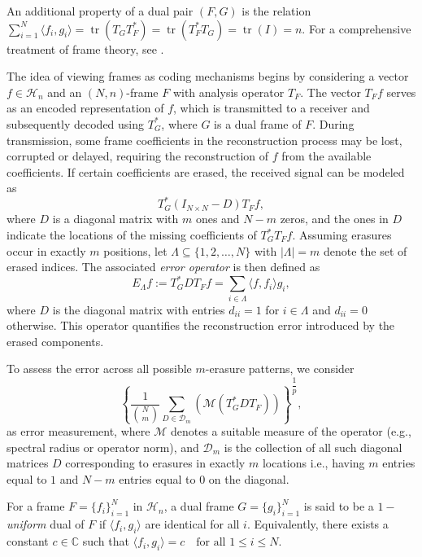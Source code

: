\documentclass[final,1p,times]{elsarticle}
\begin{document}
\noindent
An additional property of a dual pair \( (F, G) \) is the relation  $\sum_{i=1}^N \langle f_i, g_i \rangle = \operatorname{tr}(T_G T_F^*) = \operatorname{tr}(T_F^* T_G) = \operatorname{tr}(I) = n.$
For a comprehensive treatment of frame theory, see \cite{ole}.

   The idea of viewing frames as coding mechanisms begins by considering a vector 
\( f \in \mathcal{H}_n \) and an \((N,n)\)-frame \( F \) with analysis operator \( T_F \). 
The vector \( T_F f \) serves as an encoded representation of \( f \), 
which is transmitted to a receiver and subsequently decoded using \( T_G^* \), 
where \( G \) is a dual frame of \( F \).  During transmission, some frame coefficients in the reconstruction process may be lost,  corrupted or delayed, requiring the reconstruction of \( f \) from the available coefficients. 
If certain coefficients are erased, the received signal can be modeled as
\[
T_G^* (I_{N \times N} - D) T_F f,
\]
where \( D \) is a diagonal matrix with \( m \) ones and \( N-m \) zeros, 
and the ones in \( D \) indicate the locations of the missing coefficients of 
\( T_G^* T_F f \). Assuming erasures occur in exactly \( m \) positions, let 
\( \Lambda \subseteq \{1,2,\dots,N\} \) with \( |\Lambda| = m \) denote the set of erased indices. 
The associated \emph{error operator} is then defined as
\[
E_{\Lambda} f := T_G^* D T_F f 
= \sum_{i \in \Lambda} \langle f, f_i \rangle g_i,
\]
where \( D \) is the diagonal matrix with entries 
\( d_{ii} = 1 \) for \( i \in \Lambda \) and \( d_{ii} = 0 \) otherwise. 
This operator quantifies the reconstruction error introduced by the erased components.
 
   
   
   
   
   To assess the error across all possible $m$-erasure patterns, we consider 
\[
\left\{\frac{1}{\binom{N}{m}}\sum\limits_{D \in \mathcal{D}_m }\left(\mathcal{M} \left(T_G^* D T_F \right)\right)\right\}^{\dfrac{1}{p}},
\]
as error measurement, where $\mathcal{M}$ denotes a suitable measure of the operator (e.g., spectral radius or operator norm), and $\mathcal{D}_m$ is the collection of all such diagonal matrices $D$ corresponding to erasures in exactly $m$ locations i.e., having $m$ entries equal to $1$ and $N - m$ entries equal to $0$ on the diagonal.

	

    \begin{defn}
For a frame \( F = \{f_i\}_{i=1}^N \) in \( \mathcal{H}_n \), 
a dual frame \( G = \{g_i\}_{i=1}^N \)  is said to be a \emph{\(1-\)uniform} dual of $F$
if \( \langle f_i, g_i \rangle \) are identical for all \( i \). 
Equivalently, there exists a constant \( c \in \mathbb{C} \) such that $\langle f_i, g_i \rangle = c \quad \text{for all } 1 \leq i \leq N.$
\end{defn}
\end{document}
